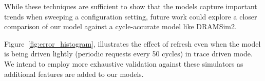 While these techniques are sufficient to show that the models capture important
trends when sweeping a configuration setting, future work could explore a closer
comparison of our model against a cycle-accurate model like DRAMSim2.

Figure~\ref{fig:error_histogram}, illustrates the effect of refresh even when
the model is being driven lightly (periodic requests every 50 cycles) in trace
driven mode. We intend to employ more exhaustive validation against these
simulators as additional features are added to our models.


